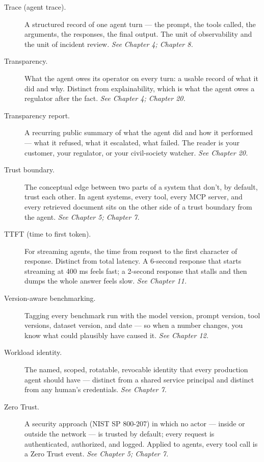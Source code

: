 \begin{description}
  \item[Trace (agent trace).] A structured record of one agent turn — the prompt, the tools called, the arguments, the responses, the final output. The unit of observability and the unit of incident review. \textit{See Chapter 4; Chapter 8.}
  \item[Transparency.] What the agent owes its operator on every turn: a usable record of what it did and why. Distinct from explainability, which is what the agent owes a regulator after the fact. \textit{See Chapter 4; Chapter 20.}
  \item[Transparency report.] A recurring public summary of what the agent did and how it performed — what it refused, what it escalated, what failed. The reader is your customer, your regulator, or your civil-society watcher. \textit{See Chapter 20.}
  \item[Trust boundary.] The conceptual edge between two parts of a system that don't, by default, trust each other. In agent systems, every tool, every MCP server, and every retrieved document sits on the other side of a trust boundary from the agent. \textit{See Chapter 5; Chapter 7.}
  \item[TTFT (time to first token).] For streaming agents, the time from request to the first character of response. Distinct from total latency. A 6-second response that starts streaming at 400 ms feels fast; a 2-second response that stalls and then dumps the whole answer feels slow. \textit{See Chapter 11.}
  \item[Version-aware benchmarking.] Tagging every benchmark run with the model version, prompt version, tool versions, dataset version, and date — so when a number changes, you know what could plausibly have caused it. \textit{See Chapter 12.}
  \item[Workload identity.] The named, scoped, rotatable, revocable identity that every production agent should have — distinct from a shared service principal and distinct from any human's credentials. \textit{See Chapter 7.}
  \item[Zero Trust.] A security approach (NIST SP 800-207) in which no actor — inside or outside the network — is trusted by default; every request is authenticated, authorized, and logged. Applied to agents, every tool call is a Zero Trust event. \textit{See Chapter 5; Chapter 7.}
\end{description}

\stoptwocol
